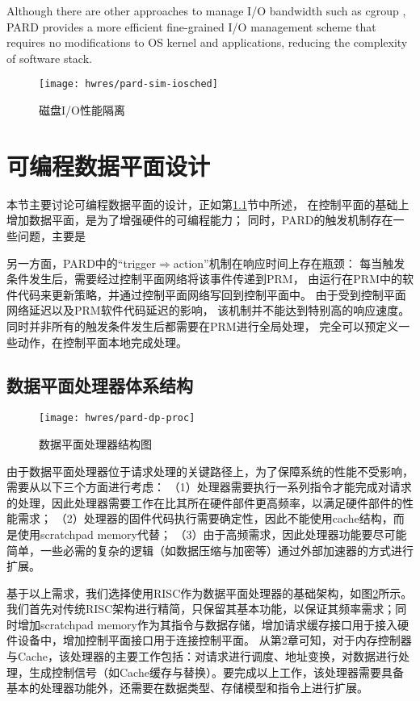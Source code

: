 Although there are other approaches to manage I/O bandwidth such as cgroup \cite{cgroup},
PARD provides a more efficient fine-grained I/O management scheme that requires
no modifications to OS kernel and applications, reducing the complexity of software
stack.

\begin{figure}[tb]
  \centering
  \texttt{[image: hwres/pard-sim-iosched]}
  \caption{磁盘I/O性能隔离}
  \label{fig:pardsim:iosched}
\end{figure}


\section{可编程数据平面设计}

本节主要讨论可编程数据平面的设计，正如第\ref{}节中所述，
在控制平面的基础上增加数据平面，是为了增强硬件的可编程能力；
同时，PARD的触发机制存在一些问题，主要是

另一方面，PARD中的``trigger$\Rightarrow$action''机制在响应时间上存在瓶颈：
每当触发条件发生后，需要经过控制平面网络将该事件传递到PRM，
由运行在PRM中的软件代码来更新策略，并通过控制平面网络写回到控制平面中。
由于受到控制平面网络延迟以及PRM软件代码延迟的影响，
该机制并不能达到特别高的响应速度。
同时并非所有的触发条件发生后都需要在PRM进行全局处理，
完全可以预定义一些动作，在控制平面本地完成处理。

\subsection{数据平面处理器体系结构}

\begin{figure}[tb]
  \centering
  \texttt{[image: hwres/pard-dp-proc]}
  \caption{数据平面处理器结构图}
  \label{fig:pard-dp-proc}
\end{figure}

由于数据平面处理器位于请求处理的关键路径上，为了保障系统的性能不受影响，需要从以下三个方面进行考虑：
（1）处理器需要执行一系列指令才能完成对请求的处理，因此处理器需要工作在比其所在硬件部件更高频率，以满足硬件部件的性能需求；
（2）处理器的固件代码执行需要确定性，因此不能使用cache结构，而是使用scratchpad memory代替；
（3）由于高频需求，因此处理器功能要尽可能简单，一些必需的复杂的逻辑（如数据压缩与加密等）通过外部加速器的方式进行扩展。

基于以上需求，我们选择使用RISC作为数据平面处理器的基础架构，如图\ref{fig:pard-dp-proc}所示。我们首先对传统RISC架构进行精简，只保留其基本功能，以保证其频率需求；同时增加scratchpad memory作为其指令与数据存储，增加请求缓存接口用于接入硬件设备中，增加控制平面接口用于连接控制平面。
从第2章可知，对于内存控制器与Cache，该处理器的主要工作包括：对请求进行调度、地址变换，对数据进行处理，生成控制信号（如Cache缓存与替换）。要完成以上工作，该处理器需要具备基本的处理器功能外，还需要在数据类型、存储模型和指令上进行扩展。


